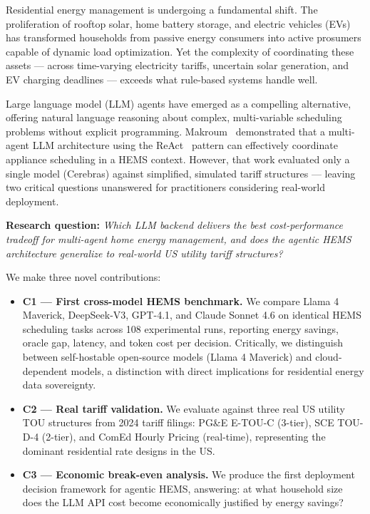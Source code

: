 \documentclass[conference]{IEEEtran}
\begin{document}
Residential energy management is undergoing a fundamental shift.
The proliferation of rooftop solar, home battery storage, and electric vehicles
(EVs) has transformed households from passive energy consumers into active
prosumers capable of dynamic load optimization.
Yet the complexity of coordinating these assets --- across time-varying
electricity tariffs, uncertain solar generation, and EV charging deadlines ---
exceeds what rule-based systems handle well.

Large language model (LLM) agents have emerged as a compelling alternative,
offering natural language reasoning about complex, multi-variable scheduling
problems without explicit programming.
Makroum~\cite{makroum2025agentic} demonstrated that a multi-agent LLM
architecture using the ReAct~\cite{yao2023react} pattern can effectively
coordinate appliance scheduling in a HEMS context.
However, that work evaluated only a single model (Cerebras) against
simplified, simulated tariff structures --- leaving two critical questions
unanswered for practitioners considering real-world deployment.

\textbf{Research question:}
\textit{Which LLM backend delivers the best cost-performance tradeoff for
multi-agent home energy management, and does the agentic HEMS architecture
generalize to real-world US utility tariff structures?}

We make three novel contributions:

\begin{itemize}
  \item \textbf{C1 --- First cross-model HEMS benchmark.}
    We compare Llama 4 Maverick, DeepSeek-V3, GPT-4.1, and Claude Sonnet 4.6
    on identical HEMS scheduling tasks across 108 experimental runs,
    reporting energy savings, oracle gap, latency, and token cost per decision.
    Critically, we distinguish between self-hostable open-source models
    (Llama 4 Maverick) and cloud-dependent models, a distinction with direct
    implications for residential energy data sovereignty.

  \item \textbf{C2 --- Real tariff validation.}
    We evaluate against three real US utility TOU structures from 2024
    tariff filings: PG\&E E-TOU-C (3-tier), SCE TOU-D-4 (2-tier),
    and ComEd Hourly Pricing (real-time), representing the dominant
    residential rate designs in the US.

  \item \textbf{C3 --- Economic break-even analysis.}
    We produce the first deployment decision framework for agentic HEMS,
    answering: at what household size does the LLM API cost become
    economically justified by energy savings?
\end{itemize}
\end{document}
